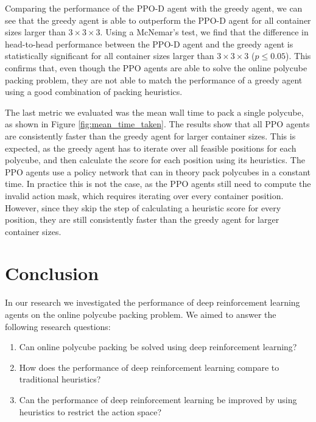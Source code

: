 \documentclass[conference]{IEEEtran}
\begin{document}
Comparing the performance of the PPO-D agent with the greedy agent, we can see that the greedy agent is able to outperform the PPO-D agent for all container sizes larger than $3 \times 3 \times 3$.
Using a McNemar's test, we find that the difference in head-to-head performance between the PPO-D agent and the greedy agent is statistically significant for all container sizes larger than $3 \times 3 \times 3$ ($p \leq 0.05$).
This confirms that, even though the PPO agents are able to solve the online polycube packing problem, they are not able to match the performance of a greedy agent using a good combination of packing heuristics.

The last metric we evaluated was the mean wall time to pack a single polycube, as shown in Figure \ref{fig:mean_time_taken}.
The results show that all PPO agents are consistently faster than the greedy agent for larger container sizes.
This is expected, as the greedy agent has to iterate over all feasible positions for each polycube, and then calculate the score for each position using its heuristics.
The PPO agents use a policy network that can in theory pack polycubes in a constant time.
In practice this is not the case, as the PPO agents still need to compute the invalid action mask, which requires iterating over every container position.
However, since they skip the step of calculating a heuristic score for every position, they are still consistently faster than the greedy agent for larger container sizes.

%
%
\section{Conclusion} \label{sec:conclusion}
In our research we investigated the performance of deep reinforcement learning agents on the online polycube packing problem.
We aimed to answer the following research questions:

\begin{enumerate}
    \item Can online polycube packing be solved using deep reinforcement learning?
    \item How does the performance of deep reinforcement learning compare to traditional heuristics?
    \item Can the performance of deep reinforcement learning be improved by using heuristics to restrict the action space?
\end{enumerate}
\end{document}
